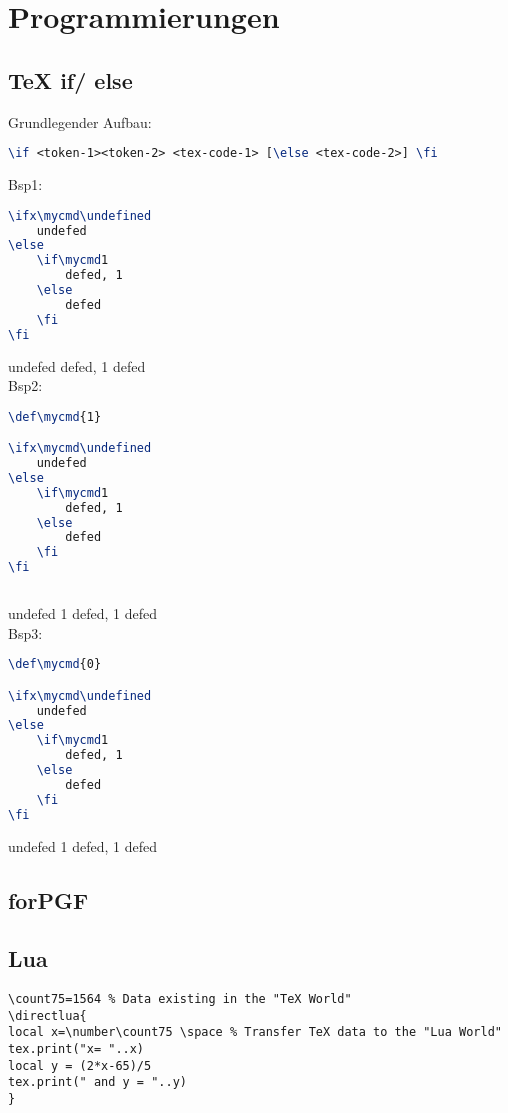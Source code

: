 \chapter{Programmierungen}\label{chap:programming}
\section{{\TeX} if/ else}\label{sec:tex}
Grundlegender Aufbau:\\
\begin{lstlisting}[language=TeX]
\if <token-1><token-2> <tex-code-1> [\else <tex-code-2>] \fi
\end{lstlisting}
Bsp1:\\
\begin{lstlisting}[language=TeX]
\ifx\mycmd\undefined
	undefed
\else
	\if\mycmd1
		defed, 1
	\else
		defed
	\fi
\fi
\end{lstlisting}

\ifx\mycmd\undefined
	undefed
\else
	\if{}
		defed, 1
	\else
		defed
	\fi
\fi
\\Bsp2:\\
\begin{lstlisting}[language=TeX]
\def\mycmd{1}

\ifx\mycmd\undefined
	undefed
\else
	\if\mycmd1
		defed, 1
	\else
		defed
	\fi
\fi
	
\end{lstlisting}

\def\mycmd{1}

\ifx\mycmd\undefined
	undefed
\else
	\if\mycmd1
		defed, 1
	\else
		defed
	\fi
\fi
\\Bsp3:\\
\begin{lstlisting}[language=TeX]
\def\mycmd{0}

\ifx\mycmd\undefined
	undefed
\else
	\if\mycmd1
		defed, 1
	\else
		defed
	\fi
\fi
\end{lstlisting}


\def\mycmd{0}

\ifx\mycmd\undefined
	undefed
\else
	\if\mycmd1
		defed, 1
	\else
		defed
	\fi
\fi


\section{forPGF}\label{sec:pgf}

\section{Lua}\label{sec:lua}
\begin{lstlisting}[language={[5.0]Lua}]
\count75=1564 % Data existing in the "TeX World"
\directlua{
local x=\number\count75 \space % Transfer TeX data to the "Lua World"
tex.print("x= "..x)
local y = (2*x-65)/5
tex.print(" and y = "..y)
}
\end{lstlisting}

